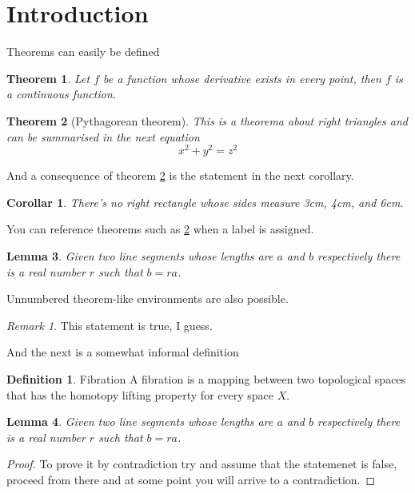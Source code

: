 \documentclass[12pt]{article}
\newtheorem{theorem}{Theorem}[section]
\newtheorem{corollary}{Corollar}[theorem]
\newtheorem{lemma}[theorem]{Lemma}
\theoremstyle{definition}
\newtheorem{definition}{Definition}[section]
\theoremstyle{remark}
\newtheorem*{remark}{Remark}
\begin{document}
\section{Introduction}
Theorems can easily be defined
 
\begin{theorem}
Let $f$ be a function whose derivative exists in every point, then $f$ is 
a continuous function.
\end{theorem}
 
\begin{theorem}[Pythagorean theorem]
\label{pythagorean}
This is a theorema about right triangles and can be summarised in the next 
equation 
\[ x^2 + y^2 = z^2 \]
\end{theorem}
 
And a consequence of theorem \ref{pythagorean} is the statement in the next 
corollary.
 
\begin{corollary}
There's no right rectangle whose sides measure 3cm, 4cm, and 6cm.
\end{corollary}
 
You can reference theorems such as \ref{pythagorean} when a label is assigned.
 
\begin{lemma}
Given two line segments whose lengths are $a$ and $b$ respectively there is a 
real number $r$ such that $b=ra$.
\end{lemma}

Unnumbered theorem-like environments are also possible.
 
\begin{remark}
This statement is true, I guess.
\end{remark}
 
And the next is a somewhat informal definition
 
\theoremstyle{definition}
\begin{definition}{Fibration}
A fibration is a mapping between two topological spaces that has the homotopy lifting property for every space $X$.
\end{definition}

\begin{lemma}
Given two line segments whose lengths are $a$ and $b$ respectively there 
is a real number $r$ such that $b=ra$.
\end{lemma}
 
\begin{proof}
To prove it by contradiction try and assume that the statemenet is false,
proceed from there and at some point you will arrive to a contradiction.
\end{proof}
\end{document}
